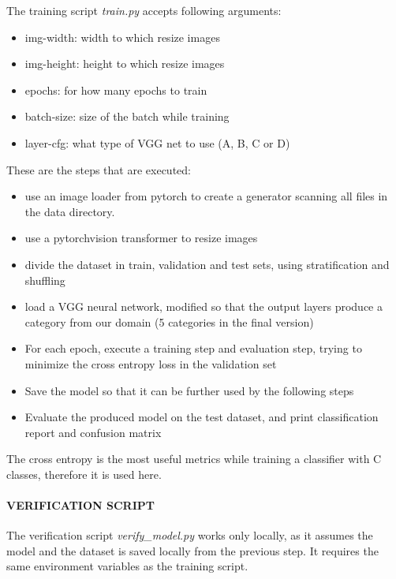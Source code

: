 \documentclass[
]{article}
\providecommand{\tightlist}{%
  \setlength{\itemsep}{0pt}\setlength{\parskip}{0pt}}
\begin{document}
The training script \emph{train.py} accepts following arguments:

\begin{itemize}
\tightlist
\item
  img-width: width to which resize images
\item
  img-height: height to which resize images
\item
  epochs: for how many epochs to train
\item
  batch-size: size of the batch while training
\item
  layer-cfg: what type of VGG net to use (A, B, C or D)
\end{itemize}

These are the steps that are executed:

\begin{itemize}
\tightlist
\item
  use an image loader from pytorch to create a generator scanning all
  files in the data directory.
\item
  use a pytorchvision transformer to resize images
\item
  divide the dataset in train, validation and test sets, using
  stratification and shuffling
\item
  load a VGG neural network, modified so that the output layers produce
  a category from our domain (5 categories in the final version)
\item
  For each epoch, execute a training step and evaluation step, trying to
  minimize the cross entropy loss in the validation set
\item
  Save the model so that it can be further used by the following steps
\item
  Evaluate the produced model on the test dataset, and print
  classification report and confusion matrix
\end{itemize}

The cross entropy is the most useful metrics while training a classifier
with C classes, therefore it is used here.

\hypertarget{verification-script}{%
\paragraph{VERIFICATION SCRIPT}\label{verification-script}}

The verification script \emph{verify\_model.py} works only locally, as
it assumes the model and the dataset is saved locally from the previous
step. It requires the same environment variables as the training script.
\end{document}
